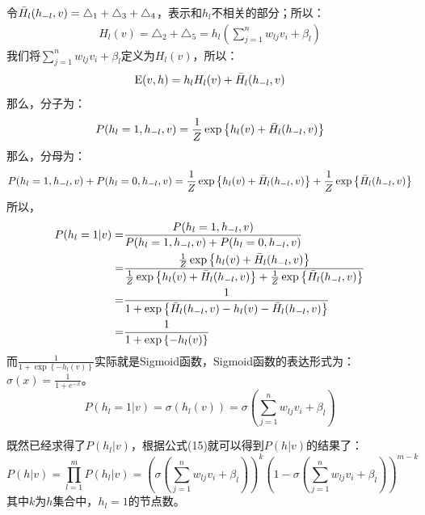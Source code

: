 \documentclass[a4paper]{article}
\begin{document}
令$\Bar{H}_l(h_{-l},v)=\triangle_1+\triangle_3+\triangle_4$，表示和$h_l$不相关的部分；所以：
\begin{equation*}
    \begin{split}
        H_l(v)=\triangle_2+\triangle_5 = h_l\left( \sum_{j=1}^n w_{lj}v_i + \beta_l \right)
    \end{split}
\end{equation*}
我们将$\sum_{j=1}^n w_{lj}v_i + \beta_l$定义为$ H_l(v)$，所以：
\begin{equation}
    \mathrm{E}(v,h) = h_lH_l(v) + \Bar{H}_l(h_{-l},v)
\end{equation}
那么，分子为：
\begin{equation}
    P(h_l=1,h_{-l},v) = \frac{1}{Z}\exp\left\{ h_l(v) + \Bar{H}_l(h_{-l},v) \right\}
\end{equation}
那么，分母为：
\begin{equation}
    P(h_l=1,h_{-l},v) + P(h_l=0,h_{-l},v) = \frac{1}{Z}\exp\left\{ h_l(v) + \Bar{H}_l(h_{-l},v) \right\} + \frac{1}{Z}\exp\left\{ \Bar{H}_l(h_{-l},v) \right\}
\end{equation}
所以，
\begin{equation}
\begin{split}
    P(h_l=1|v) = & \frac{P(h_l=1,h_{-l},v)}{P(h_l=1,h_{-l},v) + P(h_l=0,h_{-l},v)} \\
    = & \frac{\frac{1}{Z}\exp\left\{ h_l(v) + \Bar{H}_l(h_{-l},v) \right\}}{\frac{1}{Z}\exp\left\{ h_l(v) + \Bar{H}_l(h_{-l},v) \right\} + \frac{1}{Z}\exp\left\{ \Bar{H}_l(h_{-l},v) \right\}} \\
    = & \frac{1}{1+\exp\left\{ \Bar{H}_l(h_{-l},v) - h_l(v) - \Bar{H}_l(h_{-l},v) \right\}} \\
    = & \frac{1}{1+\exp\left\{ - h_l(v) \right\}}
\end{split}
\end{equation}
而$\frac{1}{1+\exp\left\{- h_l(v)\right\}}$实际就是Sigmoid函数，Sigmoid函数的表达形式为：$\sigma(x) = \frac{1}{1+e^{-x}}$。
\begin{equation}
    P(h_l=1|v) = \sigma( h_l(v)) = \sigma(\sum_{j=1}^n w_{lj}v_i + \beta_l)
\end{equation}

既然已经求得了$P(h_l|v)$，根据公式(15)就可以得到$P(h|v)$的结果了：
\begin{equation}
    P(h|v) = \prod_{l=1}^m P(h_l|v) = \left( \sigma\left(\sum_{j=1}^n w_{lj}v_i + \beta_l\right) \right)^k\left(1-\sigma\left(\sum_{j=1}^n w_{lj}v_i + \beta_l\right)\right)^{m-k}
\end{equation}
其中$k$为$h$集合中，$h_l=1$的节点数。
\end{document}

